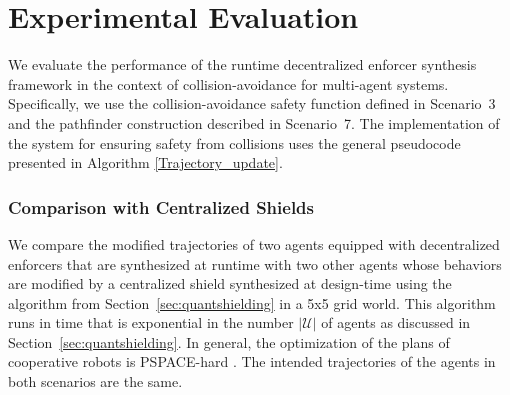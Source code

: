 \section{Experimental Evaluation}
We evaluate the performance of the runtime decentralized enforcer synthesis framework in the context of collision-avoidance for multi-agent systems. Specifically, we use the collision-avoidance safety function defined in Scenario~3 and the pathfinder construction described in Scenario~7. 
 The implementation of the system for ensuring safety from collisions uses the general pseudocode presented in Algorithm \ref{Trajectory_update}.
 
 

\subsubsection*{Comparison with Centralized Shields}

We compare the modified trajectories of two agents equipped with decentralized enforcers that are synthesized at runtime with two other agents whose behaviors are modified by a centralized shield synthesized at design-time using the algorithm from Section~\ref{sec:quantshielding} in a 5x5 grid world. This algorithm runs in time that is exponential in the number  $|\mathcal{U}|$ of agents as discussed in Section~\ref{sec:quantshielding}. In general, the optimization of the plans of cooperative robots is PSPACE-hard \cite{hardness}.
The intended trajectories of the agents in both scenarios are the same. 

